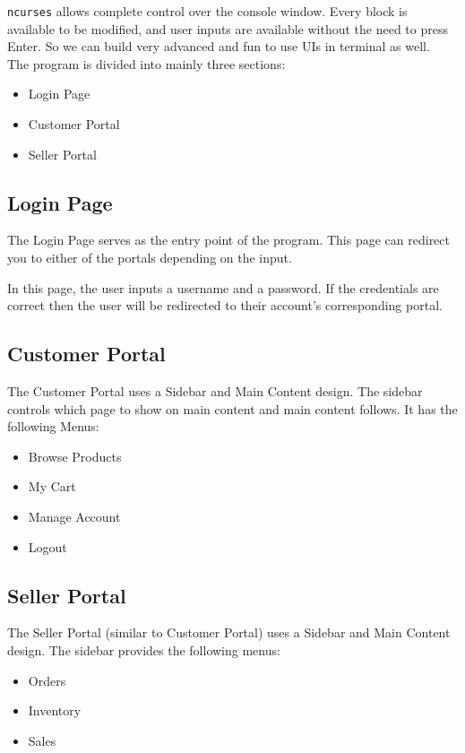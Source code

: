 \documentclass[12pt,a4paper]{article}
\begin{document}
\texttt{ncurses} allows complete control over the console window. Every block is available to be modified, and user inputs are available without the need to press Enter. So we can build very advanced and fun to use UIs in terminal as well.\\


The program is divided into mainly three sections:
\begin{itemize}
    \item Login Page
    \item Customer Portal
    \item Seller Portal
\end{itemize}

\subsection{Login Page}
The Login Page serves as the entry point of the program. This page can redirect you to either of the portals depending on the input.

In this page, the user inputs a username and a password. If the credentials are correct then the user will be redirected to their account's corresponding portal.

\subsection{Customer Portal}
The Customer Portal uses a Sidebar and Main Content design. The sidebar controls which page to show on main content and main content follows. It has the following Menus:
\begin{itemize}
    \item Browse Products
    \item My Cart
    \item Manage Account
    \item Logout
\end{itemize}

\subsection{Seller Portal}
The Seller Portal (similar to Customer Portal) uses a Sidebar and Main Content design. The sidebar provides the following menus:
\begin{itemize}
    \item Orders
    \item Inventory
    \item Sales
\end{itemize}
\end{document}
